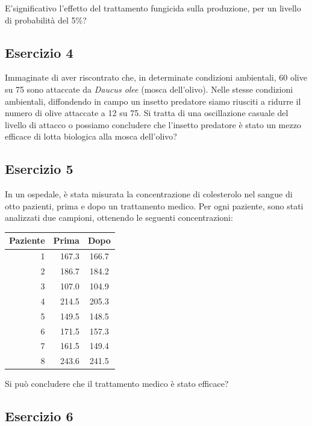 \documentclass[a4paper,12pt,oneside]{book}
\begin{document}
E'significativo l'effetto del trattamento fungicida sulla produzione, per un livello di probabilità del 5\%?

\hypertarget{esercizio-4-4}{%
\subsection{Esercizio 4}\label{esercizio-4-4}}

Immaginate di aver riscontrato che, in determinate condizioni ambientali, 60 olive su 75 sono attaccate da \emph{Daucus olee} (mosca dell'olivo). Nelle stesse condizioni ambientali, diffondendo in campo un insetto predatore siamo riusciti a ridurre il numero di olive attaccate a 12 su 75. Si tratta di una oscillazione casuale del livello di attacco o possiamo concludere che l'insetto predatore è stato un mezzo efficace di lotta biologica alla mosca dell'olivo?

\hypertarget{esercizio-5-4}{%
\subsection{Esercizio 5}\label{esercizio-5-4}}

In un ospedale, è stata misurata la concentrazione di colesterolo nel sangue di otto pazienti, prima e dopo un trattamento medico. Per ogni paziente, sono stati analizzati due campioni, ottenendo le seguenti concentrazioni:

\begin{longtable}[]{@{}rrc@{}}
\toprule()
Paziente & Prima & Dopo \\
\midrule()
\endhead
1 & 167.3 & 166.7 \\
2 & 186.7 & 184.2 \\
3 & 107.0 & 104.9 \\
4 & 214.5 & 205.3 \\
5 & 149.5 & 148.5 \\
6 & 171.5 & 157.3 \\
7 & 161.5 & 149.4 \\
8 & 243.6 & 241.5 \\
\bottomrule()
\end{longtable}

Si può concludere che il trattamento medico è stato efficace?

\hypertarget{esercizio-6-1}{%
\subsection{Esercizio 6}\label{esercizio-6-1}}
\end{document}
